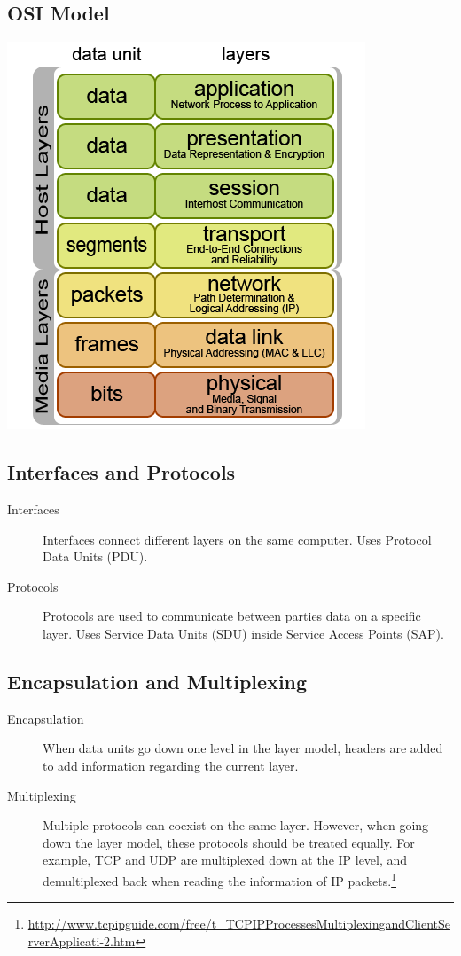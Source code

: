 \documentclass{article}
\begin{document}
\subsection{OSI Model}

\begin{center}
\includegraphics[scale=0.7]{images/OSI-model.png}\\[1cm]
\end{center}


\subsection{Interfaces and Protocols}

\begin{description}
	\item[Interfaces] Interfaces connect different layers on the same computer. Uses Protocol Data Units (PDU).
	\item[Protocols] Protocols are used to communicate between parties data on a specific layer. Uses Service Data Units (SDU) inside Service Access Points (SAP).
\end{description}


\subsection{Encapsulation and Multiplexing}

\begin{description}
	\item[Encapsulation] When data units go down one level in the layer model, headers are added to add information regarding the current layer.
	\item[Multiplexing] Multiple protocols can coexist on the same layer. However, when going down the layer model, these protocols should be treated equally. For example, TCP and UDP are multiplexed down at the IP level, and demultiplexed back when reading the information of IP packets.\footnote{\url{http://www.tcpipguide.com/free/t_TCPIPProcessesMultiplexingandClientServerApplicati-2.htm}}
\end{description}
\end{document}
